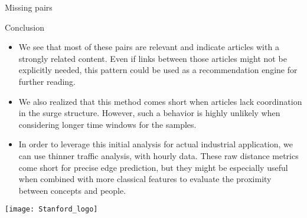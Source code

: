 \documentclass[final]{beamer}
\newlength{\onecolwid}
\begin{document}
\begin{frame}[t]
\begin{columns}[t]
\begin{column}{\onecolwid}
\begin{block}{Missing pairs}
\end{block}






\begin{block}{Conclusion}
\begin{itemize}
  \item We see that most of these pairs are relevant and indicate articles with a strongly related content. Even if links between those articles might not be explicitly needed, this pattern could be used as a recommendation engine for further reading.

  \item We also realized that this method comes short when articles lack coordination in the surge structure. However, such a behavior is highly unlikely when considering longer time windows for the samples.

  \item In order to leverage this initial analysis for actual industrial application, we can use thinner traffic analysis, with hourly data. These raw distance metrics come short for precise edge prediction, but they might be especially useful when combined with more classical features to evaluate the proximity between concepts and people.
\end{itemize}


\begin{center}
    \texttt{[image: Stanford\_logo]}
\end{center}
\end{block}


\end{column}
\end{columns}
\end{frame}
\end{document}
